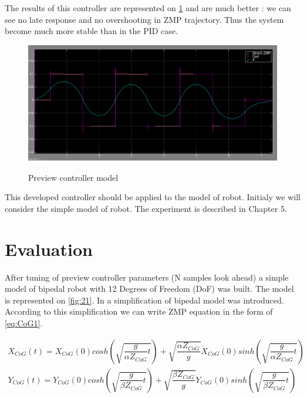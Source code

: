\documentclass[12pt,a4paper]{report}
\begin{document}
		The results of this controller are represented on \cref{fig:19} and are much better : we can see no late response and no overshooting in ZMP trajectory. Thus the system become much more stable than in the PID case. 
		
		\begin{figure}[H]
			\vspace{-0.2cm}
			\centering
 			{\includegraphics[width=1\textwidth]{19}}
			\caption{Preview controller model}
			\label{fig:19}
			\vspace{-0.1cm}
		\end{figure}
		
		This developed controller should be applied to the model of robot. Initialy we will consider the simple model of robot. The experiment is described in Chapter 5.
		
	\chapter{Evaluation}
		After tuning of preview controller parameters (N samples look ahead) a simple model of bipedal robot with 12 Degrees of Freedom (DoF) was built. The model is represented on \cref{fig:21}. In \cite{ha2007effective} a simplification of bipedal model was introduced. According to this simplification we can write ZMP equation in the form of \ref{eq:CoG1}.
		
		\begin{equation}\label{eq:CoG1}
			\begin{split}
				X_{CoG}(t) = X_{CoG}(0) cosh(\sqrt{\dfrac{g}{\alpha Z_{CoG}} t}) + \sqrt{\dfrac{\alpha Z_{CoG}}{g}} \dot{X}_{CoG}(0) sinh(\sqrt{\dfrac{g}{\alpha Z_{CoG}} t})\\
				Y_{CoG}(t) = Y_{CoG}(0) cosh(\sqrt{\dfrac{g}{\beta Z_{CoG}} t}) + \sqrt{\dfrac{\beta Z_{CoG}}{g}} \dot{Y}_{CoG}(0) sinh(\sqrt{\dfrac{g}{\beta Z_{CoG}} t})
			\end{split}
		\end{equation}
		
\end{document}
